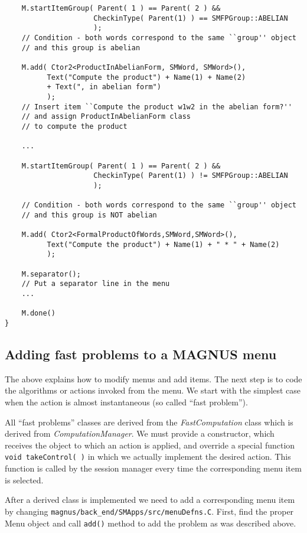 \documentclass[12pt]{article}
\def\magnus{MAGNUS }
\begin{document}
\begin{verbatim}
    M.startItemGroup( Parent( 1 ) == Parent( 2 ) &&
                     CheckinType( Parent(1) ) == SMFPGroup::ABELIAN
                     );
    // Condition - both words correspond to the same ``group'' object
    // and this group is abelian

    M.add( Ctor2<ProductInAbelianForm, SMWord, SMWord>(),
          Text("Compute the product") + Name(1) + Name(2)
          + Text(", in abelian form")
          );
    // Insert item ``Compute the product w1w2 in the abelian form?''
    // and assign ProductInAbelianForm class
    // to compute the product

    ...

    M.startItemGroup( Parent( 1 ) == Parent( 2 ) &&
                     CheckinType( Parent(1) ) != SMFPGroup::ABELIAN
                     );

    // Condition - both words correspond to the same ``group'' object
    // and this group is NOT abelian

    M.add( Ctor2<FormalProductOfWords,SMWord,SMWord>(),
          Text("Compute the product") + Name(1) + " * " + Name(2)
          );

    M.separator();
    // Put a separator line in the menu
    ...

    M.done()
}

\end{verbatim}
\normalsize

\subsection{ Adding fast problems to a \magnus menu}
The above explains how to modify menus and add items.
The next step is to code the algorithms or actions
invoked from the menu. We start with the simplest case when the action
is almost instantaneous (so called ``fast problem'').

All ``fast problems'' classes are derived from the {\em FastComputation} class
which is derived from {\em ComputationManager}.
We must provide a constructor, which  receives
the object to which an action is applied, and override a special function
{\tt  void takeControl( )} in which we actually implement the desired action.
This function is called by the session manager every time the corresponding
menu item is selected.

After a derived class is implemented we need to add a corresponding menu
item by changing {\tt magnus/back\_end/SMApps/src/menuDefns.C}.
First, find the proper Menu object and call {\tt add()} method to
add the problem as was described above.
\end{document}

